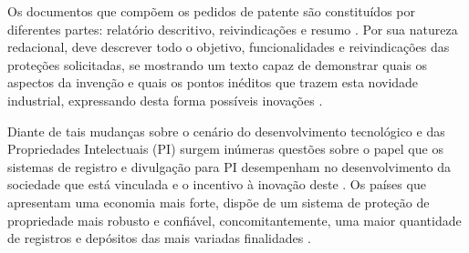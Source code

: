 Os documentos que compõem os pedidos de patente são constituídos por diferentes partes: relatório descritivo, reivindicações e resumo \cite{inpi_diretrizes_2011}. Por sua natureza redacional, deve descrever todo o objetivo, funcionalidades e reivindicações das proteções solicitadas, se mostrando um texto capaz de demonstrar quais os aspectos da invenção e quais os pontos inéditos que trazem esta novidade industrial, expressando desta forma possíveis inovações \cite{wipo_global_2018}.  


Diante de tais mudanças sobre o cenário do desenvolvimento tecnológico e das Propriedades Intelectuais (PI) surgem inúmeras questões sobre o papel que os sistemas de registro e divulgação para PI desempenham no desenvolvimento da sociedade que está vinculada e o incentivo à inovação deste \cite{segala_os_2016}. Os países que apresentam uma economia mais forte, dispõe de um sistema de proteção de propriedade mais robusto e confiável, concomitantemente, uma maior quantidade de registros e depósitos das mais variadas finalidades \cite{mueller_universidades_2014}.



